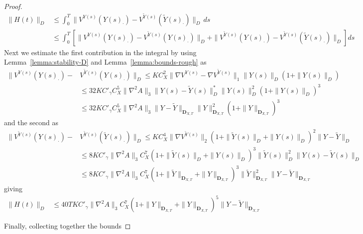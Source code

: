 \documentclass[a4paper,12pt,reqno]{amsart}
\newcommand{\wt}{\widetilde}
\newcommand{\norm}[1]{\|#1\|}
\newcommand{\DXT}{\mathbf{D}_{X,T}}
\begin{document}
\begin{proof}
\begin{equation*}
  \begin{split}
\norm{H(t)}_{D} & \le  \int_0^T \norm{V^{Y(s)}(Y(s)_\cdot) -
V^{\wt Y(s)}(\wt Y(s)_\cdot)}_D \,ds
\\ & \le  \int_0^T \left[\norm{V^{Y(s)}(Y(s)_\cdot) - V^{\wt
    Y(s)}(Y(s)_\cdot)}_D  +  \norm{V^{\wt Y(s)}(Y(s)_\cdot)-
V^{\wt Y(s)}(\wt Y(s)_\cdot)}_D \right]ds
  \end{split}
\end{equation*}
Next we estimate the first contribution in the integral by using
Lemma~\ref{lemma:stability-D} and Lemma~\ref{lemma:bounds-rough} as
\begin{equation*}
  \begin{split}
\norm{V^{Y(s)}(Y(s)_\cdot) - & V^{\wt
    Y(s)}(Y(s)_\cdot)}_D  \le
K C_X^2 \norm{\nabla V^{Y(s)} - \nabla V^{\wt
    Y(s)} }_1 \norm{Y(s)}_D (1+\norm{Y(s)}_D)
\\ & \le 32
K C'_\gamma C_X^5 \norm{\nabla^2 A}_3 \norm{Y(s)-\wt Y(s)}^*_D \norm{Y(s)}_D^2 (1+\norm{Y(s)}_D)^3
\\ & \le 32
K C'_\gamma C_X^5 \norm{\nabla^2 A}_3 \norm{Y-\wt Y}_{\DXT} \norm{Y}_{\DXT}^2 (1+\norm{Y}_{\DXT})^3
  \end{split}
\end{equation*}
and the second as
\begin{equation*}
  \begin{split}
 \norm{V^{\wt Y(s)}(Y(s)_\cdot)- &
V^{\wt Y(s)}(\wt Y(s)_\cdot)}_D
 \le K C_X^4 \norm{\nabla V^{\wt Y(s)}}_2 (1+\norm{\wt
    Y(s)}_D+ \norm{Y(s)}_D)^2 \norm{Y-\wt Y}_D     
\\ & \le 8 K C'_\gamma \norm{\nabla^2 A}_3 C_X^7  (1+\norm{\wt
    Y(s)}_D+ \norm{Y(s)}_D)^3 \norm{\wt Y(s)}^2_D \norm{Y(s)-\wt Y(s)}_D     
\\ & \le 8 K C'_\gamma \norm{\nabla^2 A}_3 C_X^7  (1+\norm{\wt
    Y}_{\DXT}+ \norm{Y}_{\DXT})^3 \norm{\wt Y}^2_{\DXT} \norm{Y-\wt Y}_{\DXT}     
  \end{split}
\end{equation*}
giving
\begin{equation*}
  \begin{split}
\norm{H(t)}_{D} &  
\le  40 T  K C'_\gamma \norm{\nabla^2 A}_3 C_X^7 
(1+\norm{Y}_{\DXT}+\norm{Y}_{\DXT})^5 \norm{Y-\wt Y}_{\DXT}
  \end{split}
\end{equation*}



Finally, collecting together the
bounds


\end{proof}
\end{document}

